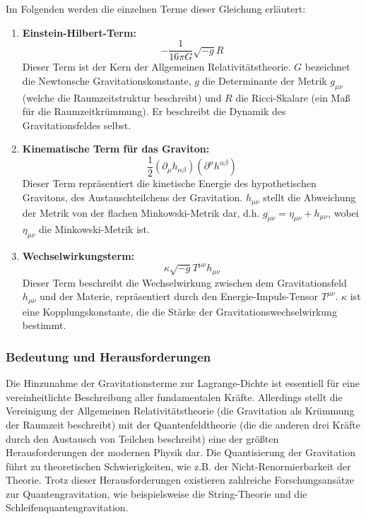 \documentclass{article}
\begin{document}
Im Folgenden werden die einzelnen Terme dieser Gleichung erläutert:

\begin{enumerate}
	\item \textbf{Einstein-Hilbert-Term:}
	\begin{equation}
		-\frac{1}{16\pi G} \sqrt{-g}R
	\end{equation}
	Dieser Term ist der Kern der Allgemeinen Relativitätstheorie.  $G$ bezeichnet die Newtonsche Gravitationskonstante, $g$ die Determinante der Metrik $g_{\mu\nu}$ (welche die Raumzeitstruktur beschreibt) und $R$ die Ricci-Skalare (ein Maß für die Raumzeitkrümmung).  Er beschreibt die Dynamik des Gravitationsfeldes selbst.
	
	\item \textbf{Kinematische Term für das Graviton:}
	\begin{equation}
		\frac{1}{2}(\partial_\mu h_{\alpha\beta})(\partial^\mu h^{\alpha\beta})
	\end{equation}
	Dieser Term repräsentiert die kinetische Energie des hypothetischen Gravitons, des Austauschteilchens der Gravitation.  $h_{\mu\nu}$ stellt die Abweichung der Metrik von der flachen Minkowski-Metrik dar, d.h. $g_{\mu\nu} = \eta_{\mu\nu} + h_{\mu\nu}$, wobei $\eta_{\mu\nu}$ die Minkowski-Metrik ist.
	
	\item \textbf{Wechselwirkungsterm:}
	\begin{equation}
		\kappa \sqrt{-g}T^{\mu\nu}h_{\mu\nu}
	\end{equation}
	Dieser Term beschreibt die Wechselwirkung zwischen dem Gravitationsfeld $h_{\mu\nu}$ und der Materie, repräsentiert durch den Energie-Impuls-Tensor $T^{\mu\nu}$.  $\kappa$ ist eine Kopplungskonstante, die die Stärke der Gravitationswechselwirkung bestimmt.
\end{enumerate}

\subsubsection{Bedeutung und Herausforderungen}

Die Hinzunahme der Gravitationsterme zur Lagrange-Dichte ist essentiell für eine vereinheitlichte Beschreibung aller fundamentalen Kräfte.  Allerdings stellt die Vereinigung der Allgemeinen Relativitätstheorie (die Gravitation als Krümmung der Raumzeit beschreibt) mit der Quantenfeldtheorie (die die anderen drei Kräfte durch den Austausch von Teilchen beschreibt) eine der größten Herausforderungen der modernen Physik dar.  Die Quantisierung der Gravitation führt zu theoretischen Schwierigkeiten, wie z.B. der Nicht-Renormierbarkeit der Theorie.  Trotz dieser Herausforderungen existieren zahlreiche Forschungsansätze zur Quantengravitation, wie beispielsweise die String-Theorie und die Schleifenquantengravitation.
\end{document}
